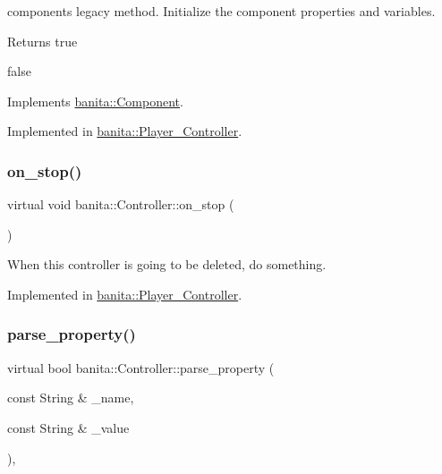 component\textquotesingle{}s legacy method. Initialize the component properties and variables. 

\begin{DoxyReturn}{Returns}
true 

false 
\end{DoxyReturn}


Implements \mbox{\hyperlink{classbanita_1_1_component_a2f700c071185f7033caa69576dafa9e7}{banita\+::\+Component}}.



Implemented in \mbox{\hyperlink{classbanita_1_1_player___controller_a42c2960117c977daf72083452fb69e86}{banita\+::\+Player\+\_\+\+Controller}}.

\mbox{\label{classbanita_1_1_controller_a988fb70a657c61afb82f4f4cf25e7c66}} 
\subsubsection{\texorpdfstring{on\_stop()}{on\_stop()}}
{\footnotesize\ttfamily virtual void banita\+::\+Controller\+::on\+\_\+stop (\begin{DoxyParamCaption}{ }\end{DoxyParamCaption})\hspace{0.3cm}{\ttfamily [pure virtual]}}



When this controller is going to be deleted, do something. 



Implemented in \mbox{\hyperlink{classbanita_1_1_player___controller_aedd233c9dcd10f9c8998f48a840f2e57}{banita\+::\+Player\+\_\+\+Controller}}.

\mbox{\label{classbanita_1_1_controller_a74933400a4ed56e68ce5cb11ec395a1b}} 
\subsubsection{\texorpdfstring{parse\_property()}{parse\_property()}}
{\footnotesize\ttfamily virtual bool banita\+::\+Controller\+::parse\+\_\+property (\begin{DoxyParamCaption}\item[{const String \&}]{\+\_\+name,  }\item[{const String \&}]{\+\_\+value }\end{DoxyParamCaption})\hspace{0.3cm}{\ttfamily [override]}, {}}



